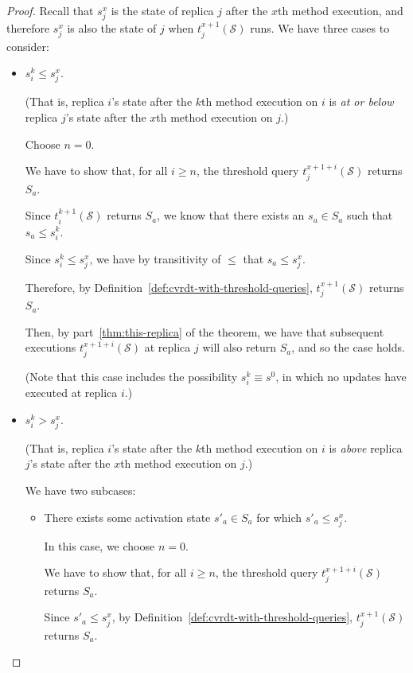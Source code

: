 \begin{proof}
  Recall that $s^x_j$ is the state of replica $j$ after the $x$th
  method execution, and therefore $s^x_j$ is also the state of $j$
  when $t^{x+1}_j(\mathcal{S})$ runs.
  We have three cases to consider:
  \begin{itemize}
  \item $s^k_i \leq s^x_j$.

    (That is, replica $i$'s state after the $k$th method execution on $i$
    is \emph{at or below} replica $j$'s state after the $x$th method
    execution on $j$.)

    Choose $n = 0$.

    We have to show that, for all $i \geq n$, the threshold query
    $t^{x+1+i}_j(\mathcal{S})$ returns $S_a$.

    Since $t^{k+1}_i(\mathcal{S})$ returns $S_a$, we know that there
    exists an $s_a \in S_a$ such that $s_a \leq s^k_i$.

    Since $s^k_i \leq s^x_j$, we have by transitivity of $\leq$ that
    $s_a \leq s^x_j$.

    Therefore, by Definition~\ref{def:cvrdt-with-threshold-queries},
    $t^{x+1}_j(\mathcal{S})$ returns $S_a$.

    Then, by part~\ref{thm:this-replica} of the theorem, we have that
    subsequent executions $t^{x+1+i}_j(\mathcal{S})$ at replica $j$
    will also return $S_a$, and so the case holds.

    (Note that this case includes the possibility $s^k_i \equiv s^0$,
    in which no updates have executed at replica $i$.)

  \item $s^k_i > s^x_j$.

    (That is, replica $i$'s state after the $k$th method execution on $i$
    is \emph{above} replica $j$'s state after the $x$th method execution
    on $j$.)

    We have two subcases:

    \begin{itemize}
    \item
      There exists some activation state $s'_a \in S_a$ for which $s'_a \leq
      s^x_j$.

      In this case, we choose $n = 0$.

      We have to show that, for all $i \geq n$, the threshold query
      $t^{x+1+i}_j(\mathcal{S})$ returns $S_a$.

      Since $s'_a \leq s^x_j$, by
      Definition~\ref{def:cvrdt-with-threshold-queries},
      $t^{x+1}_j(\mathcal{S})$ returns $S_a$.


\end{itemize}
\end{itemize}
\end{proof}

